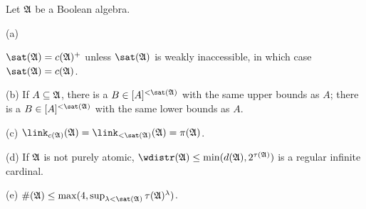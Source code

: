  Let $\frak A$ be a Boolean algebra.

(a)


\noindent $\sat(\frak A)=c(\frak A)^+$ unless $\sat(\frak A)$ is weakly
inaccessible, in which case $\sat(\frak A)=c(\frak A)$.

(b) If $A\subseteq\frak A$, there is a $B\in[A]^{<\sat(\frak A)}$ with
the same upper bounds as $A$;   there is a
$B\in[A]^{<\sat(\frak A)}$ with the same lower bounds as $A$.

(c) $\link_{c(\frak A)}(\frak A)=\link_{<\sat(\frak A)}(\frak A)
=\pi(\frak A)$.

(d) If $\frak A$ is not purely atomic,
$\wdistr(\frak A)\le\min(d(\frak A),2^{\tau(\frak A)})$ is a regular
infinite cardinal.

(e) $\#(\frak A)
\le\max(4,\sup_{\lambda<\sat(\frak A)}\tau(\frak A)^{\lambda})$.

